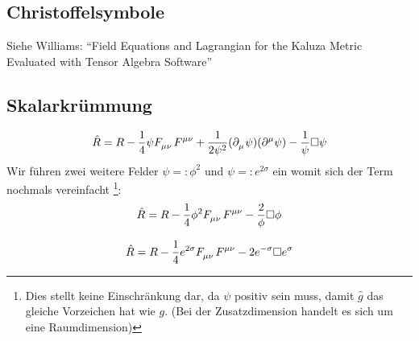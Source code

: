 \subsection{Christoffelsymbole}
Siehe Williams: "`Field Equations and Lagrangian for the Kaluza Metric
Evaluated with Tensor Algebra Software"'\cite{williams2015field}
\subsection{Skalarkrümmung}
\begin{equation}
\hat{R}=R-\frac{1}{4}\psi\tensor{F}{_\mu_\nu}\tensor{F}{^\mu^\nu}
+\frac{1}{2\psi^2}(\pdif{_\mu}\psi)(\pdif{^\mu}\psi)
-\frac{1}{\psi}\square\psi
\end{equation}
Wir führen zwei weitere Felder $\psi=:\phi^2$ und $\psi=:e^{2\sigma}$ ein womit
sich der Term nochmals vereinfacht \footnote{Dies stellt keine Einschränkung
dar, da $\psi$ positiv sein muss, damit $\hat{g}$ das gleiche Vorzeichen hat wie $g$. (Bei der Zusatzdimension handelt es sich um
eine Raumdimension)}:
\begin{equation}
\hat{R}=R-\frac{1}{4}\phi^2\tensor{F}{_\mu_\nu}\tensor{F}{^\mu^\nu}
-\frac{2}{\phi}\square \phi
\end{equation}

\begin{equation}
\hat{R}=R-\frac{1}{4}e^{2\sigma}\tensor{F}{_\mu_\nu}\tensor{F}{^\mu^\nu}
-2e^{-\sigma}\square e^{\sigma}
\end{equation}
